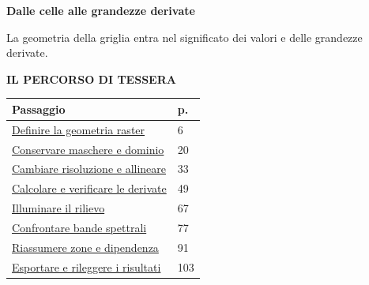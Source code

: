 \documentclass[12pt,aspectratio=1610]{beamer}
\newcommand{\PLabel}[1]{\par{\color{Classical}\bfseries\fontsize{9}{11}\selectfont\MakeUppercase{#1}}\par\vspace{1.8mm}}
\begin{document}
\begin{frame}[plain]\hypertarget{slide2}{}
\begin{lrbox}{\TitleBox}
\begin{minipage}[t]{17.7cm}\raggedright\color{Ink}\fontsize{11.3}{14.8}\selectfont
\color{Navy}\bfseries\fontsize{20.6}{24.5}\selectfont Dalle celle alle grandezze derivate
\end{minipage}\end{lrbox}

\begin{lrbox}{\RecallBox}
\begin{minipage}[t]{14.3cm}\raggedright\color{Ink}\fontsize{11.3}{14.8}\selectfont
\fontsize{10.3}{13.8}\selectfont La geometria della griglia entra nel significato dei valori e delle grandezze derivate.
\end{minipage}\end{lrbox}

\begin{lrbox}{\PilotLeftBox}
\begin{minipage}[t]{10.05cm}\raggedright\color{Ink}\fontsize{11.3}{14.8}\selectfont
\PLabel{Il percorso di Tessera}
{\fontsize{10.2}{13.1}\selectfont\renewcommand{\arraystretch}{1.45}\begin{tabular}{@{}p{8.3cm}p{0.7cm}@{}}\toprule
\textbf{Passaggio} & \textbf{p.}\\\midrule
\hyperlink{slide6}{Definire la geometria raster} & 6\\
\hyperlink{slide20}{Conservare maschere e dominio} & 20\\
\hyperlink{slide33}{Cambiare risoluzione e allineare} & 33\\
\hyperlink{slide49}{Calcolare e verificare le derivate} & 49\\
\hyperlink{slide67}{Illuminare il rilievo} & 67\\
\hyperlink{slide77}{Confrontare bande spettrali} & 77\\
\hyperlink{slide91}{Riassumere zone e dipendenza} & 91\\
\hyperlink{slide103}{Esportare e rileggere i risultati} & 103\\
\bottomrule\end{tabular}}

\end{minipage}\end{lrbox}


\end{frame}
\end{document}

